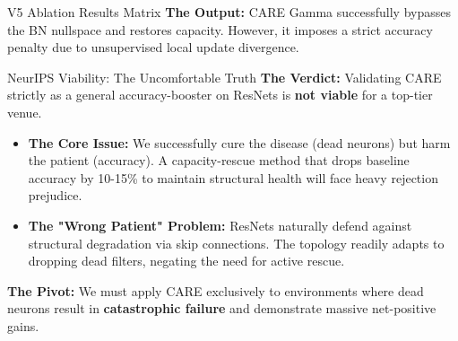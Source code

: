 \documentclass[aspectratio=169]{beamer}
\begin{document}
\begin{frame}{V5 Ablation Results Matrix}
    \textbf{The Output:} CARE Gamma successfully bypasses the BN nullspace and restores capacity. However, it imposes a strict accuracy penalty due to unsupervised local update divergence.
    
    \vspace{0.2cm}
    \begin{table}[]
        \centering
        \caption{Key Extracts from the completed 14-run V5 Suite (ResNet-18, CIFAR-10)}
    \end{table}
\end{frame}

\begin{frame}{NeurIPS Viability: The Uncomfortable Truth}
    \textbf{The Verdict:} Validating CARE strictly as a general accuracy-booster on ResNets is \textbf{not viable} for a top-tier venue.
    
    \begin{itemize}
        \item \textbf{The Core Issue:} We successfully cure the disease (dead neurons) but harm the patient (accuracy). A capacity-rescue method that drops baseline accuracy by 10-15\% to maintain structural health will face heavy rejection prejudice.
        \item \textbf{The "Wrong Patient" Problem:} ResNets naturally defend against structural degradation via skip connections. The topology readily adapts to dropping dead filters, negating the need for active rescue.
    \end{itemize}
    
    \vspace{0.3cm}
    \textbf{The Pivot:} We must apply CARE exclusively to environments where dead neurons result in \textbf{catastrophic failure} and demonstrate massive net-positive gains.
\end{frame}
\end{document}
